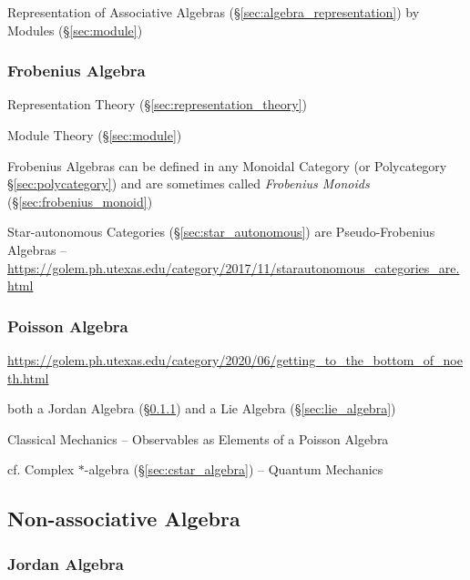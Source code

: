 \fist Representation of Associative Algebras
(\S\ref{sec:algebra_representation}) by Modules (\S\ref{sec:module})



\subsubsection{Frobenius Algebra}\label{sec:frobenius_algebra}

Representation Theory (\S\ref{sec:representation_theory})

Module Theory (\S\ref{sec:module})

Frobenius Algebras can be defined in any Monoidal Category (or
Polycategory \S\ref{sec:polycategory}) and are sometimes called
\emph{Frobenius Monoids} (\S\ref{sec:frobenius_monoid})

Star-autonomous Categories (\S\ref{sec:star_autonomous}) are Pseudo-Frobenius
Algebras
--\url{https://golem.ph.utexas.edu/category/2017/11/starautonomous_categories_are.html}



\subsubsection{Poisson Algebra}\label{sec:poisson_algebra}

\url{https://golem.ph.utexas.edu/category/2020/06/getting_to_the_bottom_of_noeth.html}

both a Jordan Algebra (\S\ref{sec:jordan_algebra}) and a Lie Algebra
(\S\ref{sec:lie_algebra})

Classical Mechanics -- Observables as Elements of a Poisson Algebra

cf. Complex $*$-algebra (\S\ref{sec:cstar_algebra}) -- Quantum Mechanics



\subsection{Non-associative Algebra}
\label{sec:nonassociative_algebra}

\subsubsection{Jordan Algebra}\label{sec:jordan_algebra}

